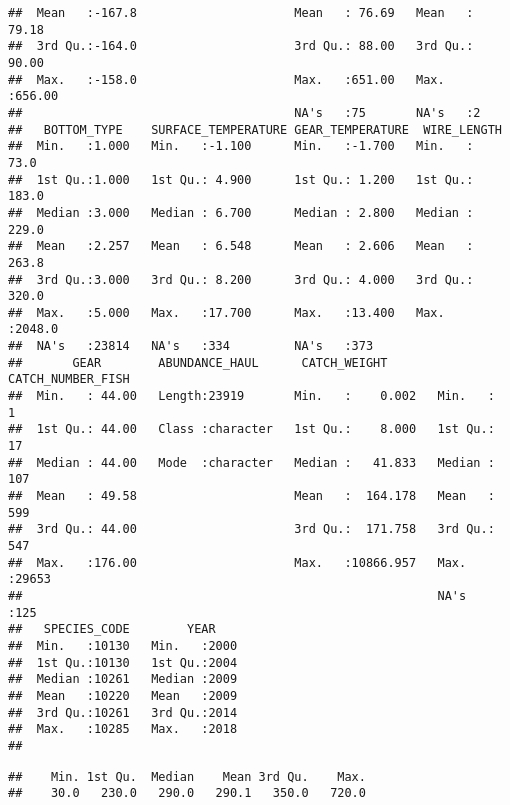 \documentclass[
]{article}
\newenvironment{Shaded}{\begin{snugshade}}{\end{snugshade}}
\newcommand{\KeywordTok}[1]{\textcolor[rgb]{0.13,0.29,0.53}{\textbf{#1}}}
\newcommand{\NormalTok}[1]{#1}
\newcommand{\OperatorTok}[1]{\textcolor[rgb]{0.81,0.36,0.00}{\textbf{#1}}}
\begin{document}
\begin{verbatim}
##  Mean   :-167.8                      Mean   : 76.69   Mean   : 79.18  
##  3rd Qu.:-164.0                      3rd Qu.: 88.00   3rd Qu.: 90.00  
##  Max.   :-158.0                      Max.   :651.00   Max.   :656.00  
##                                      NA's   :75       NA's   :2       
##   BOTTOM_TYPE    SURFACE_TEMPERATURE GEAR_TEMPERATURE  WIRE_LENGTH    
##  Min.   :1.000   Min.   :-1.100      Min.   :-1.700   Min.   :  73.0  
##  1st Qu.:1.000   1st Qu.: 4.900      1st Qu.: 1.200   1st Qu.: 183.0  
##  Median :3.000   Median : 6.700      Median : 2.800   Median : 229.0  
##  Mean   :2.257   Mean   : 6.548      Mean   : 2.606   Mean   : 263.8  
##  3rd Qu.:3.000   3rd Qu.: 8.200      3rd Qu.: 4.000   3rd Qu.: 320.0  
##  Max.   :5.000   Max.   :17.700      Max.   :13.400   Max.   :2048.0  
##  NA's   :23814   NA's   :334         NA's   :373                      
##       GEAR        ABUNDANCE_HAUL      CATCH_WEIGHT       CATCH_NUMBER_FISH
##  Min.   : 44.00   Length:23919       Min.   :    0.002   Min.   :    1    
##  1st Qu.: 44.00   Class :character   1st Qu.:    8.000   1st Qu.:   17    
##  Median : 44.00   Mode  :character   Median :   41.833   Median :  107    
##  Mean   : 49.58                      Mean   :  164.178   Mean   :  599    
##  3rd Qu.: 44.00                      3rd Qu.:  171.758   3rd Qu.:  547    
##  Max.   :176.00                      Max.   :10866.957   Max.   :29653    
##                                                          NA's   :125      
##   SPECIES_CODE        YEAR     
##  Min.   :10130   Min.   :2000  
##  1st Qu.:10130   1st Qu.:2004  
##  Median :10261   Median :2009  
##  Mean   :10220   Mean   :2009  
##  3rd Qu.:10261   3rd Qu.:2014  
##  Max.   :10285   Max.   :2018  
## 
\end{verbatim}

\begin{Shaded}
\end{Shaded}

\begin{verbatim}
##    Min. 1st Qu.  Median    Mean 3rd Qu.    Max. 
##    30.0   230.0   290.0   290.1   350.0   720.0
\end{verbatim}

\begin{Shaded}
\end{Shaded}
\end{document}
